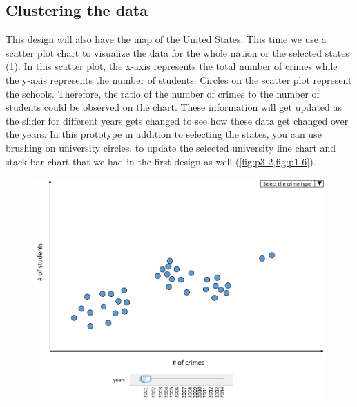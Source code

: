 \documentclass[12pt]{article}
\begin{document}
\subsection{Clustering the data} 
This design will also have the map of the United States. This time we use a scatter plot chart to visualize the data for the whole nation or the selected states (\cref{fig:p3-1}). In this scatter plot, the x-axis represents the total number of crimes while the y-axis represents the number of students. Circles on the scatter plot represent the schools. Therefore, the ratio of the number of crimes to the number of students could be observed on the chart. These information will get updated as the slider for different years gets changed to see how these data get changed over the years. In this prototype in addition to selecting the states, you can use brushing on university circles, to update the selected university line chart and stack bar chart that we had in the first design as well (\cref{fig:p3-2,fig:p1-6}). 


\begin{figure}[tbph]
   \centering{}
	       \includegraphics[width=6in]{prot3}           
\caption{}
\label{fig:p3-1}
\end{figure}
\end{document}
